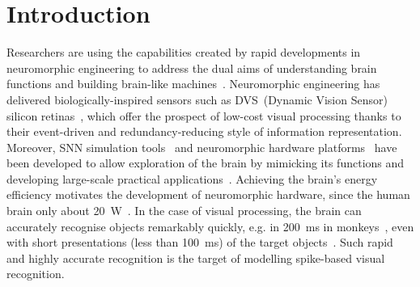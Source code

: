 \section{Introduction}
\label{sec:chapt6_intro}
Researchers are using the capabilities created by rapid developments in neuromorphic engineering to address the dual aims of understanding brain functions and building brain-like machines~\citep{furber2007neural}.
Neuromorphic engineering has delivered biologically-inspired sensors such as DVS~(Dynamic Vision Sensor) silicon retinas~\citep{serrano2013128, delbruck2008frame, yang2015dynamic, posch2014retinomorphic}, which offer the prospect of low-cost visual processing thanks to their event-driven and redundancy-reducing style of information representation.
Moreover, SNN simulation tools~\citep{davison2008pynn, gewaltig2007nest, goodman2008brian} and neuromorphic hardware platforms~\citep{furber2014spinnaker,  schemmel2010wafer,benjamin2014neurogrid,merolla2014million} have been developed to allow exploration of the brain by mimicking its functions and developing large-scale practical applications~\citep{eliasmith2012large}.
Achieving the brain's energy efficiency motivates the development of neuromorphic hardware, since the human brain \DIFdelbegin {}\DIFdelend \DIFaddbegin {}\DIFaddend only about 20~W\DIFdelbegin {}\DIFdelend ~\citep{drubach2000brain}.
In the case of visual processing, the brain can accurately recognise objects remarkably quickly, e.g. in 200~ms in monkeys~\citep{fabre1998rapid}, even with short presentations (less than 100~ms) of the target objects~\citep{keysers2001speed}.
Such rapid and highly accurate recognition is the target of modelling spike-based visual recognition.



